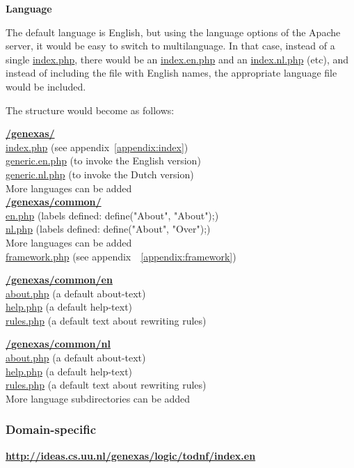 \documentclass{article}
\begin{document}

	
\textbf{Language}

The default language is English, but using the language options of the Apache server, it would be easy to switch to multilanguage. In that case, instead of a single \url{index.php}, there would be an \url{index.en.php} and an \url{index.nl.php} (etc), and instead of including the file with English names, the appropriate language file would be included.

The structure would become as follows:

\textbf{ \url{/genexas/}} \\
 \url{index.php} (see appendix~\ref{appendix:index})\\
 \url{generic.en.php} (to invoke the English version)\\
 \url{generic.nl.php} (to invoke the Dutch version)\\
 More languages can be added\\

\textbf{\url{/genexas/common/}}\\
 \url{en.php} (labels defined: define("About", "About");)\\
 \url{nl.php} (labels defined: define("About", "Over");)\\
 More languages can be added\\
 \url{framework.php} (see appendix~~\ref{appendix:framework}) 

\textbf{\url{/genexas/common/en}}\\
 \url{about.php} (a default about-text)\\
 \url{help.php} (a default help-text)\\
 \url{rules.php} (a default text about rewriting rules)
 
 \textbf{\url{/genexas/common/nl}}\\
 \url{about.php} (a default about-text)\\
 \url{help.php} (a default help-text)\\
 \url{rules.php} (a default text about rewriting rules)\\
 More language subdirectories can be added
 

\subsubsection{Domain-specific}
\textbf{\url{http://ideas.cs.uu.nl/genexas/logic/todnf/index.en}}
\end{document}
